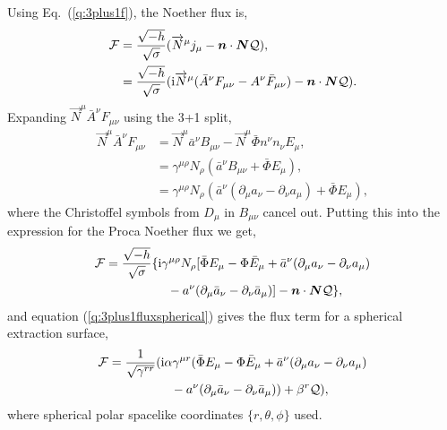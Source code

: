  Using Eq.~(\ref{q:3plus1f}), the Noether flux is,
\begin{align}
\mathcal{F} &= \frac{\sqrt{-h}}{\sqrt{\sigma}}(\overrightarrow{N}^\mu j_\mu - \boldsymbol{n} \cdot \boldsymbol{N}  \mathcal{Q}), \\
 &= \frac{\sqrt{-h}}{\sqrt{\sigma}} ( {\rm i}\overrightarrow{N}^\mu (\bar{A}^\nu F_{\mu\nu} - A^\nu \bar{F}_{\mu\nu}) - \boldsymbol{n} \cdot \boldsymbol{N}  \mathcal{Q}).
 \end{align}
 Expanding $\overrightarrow{N}^\mu \bar{A}^\nu F_{\mu\nu}$ using the 3+1 split,
 \begin{align}
 \overrightarrow{N}^\mu \bar{A}^\nu F_{\mu\nu} &= \overrightarrow{N}^\mu \bar{a}^\nu B_{\mu\nu} - \overrightarrow{N}^\mu\bar{\Phi} n^\nu n_\nu E_\mu, \\
                            &= \gamma^{\mu\rho }{N}_\rho( \bar{a}^\nu B_{\mu\nu} +  \bar{\Phi}E_\mu),\\
                            &= \gamma^{\mu\rho }{N}_\rho( \bar{a}^\nu (\partial_\mu a_\nu - \partial_\nu a_\mu) +  \bar{\Phi}E_\mu),
 \end{align}
 where the Christoffel symbols from $D_\mu$ in $B_{\mu\nu}$ cancel out. Putting this into the expression for the Proca Noether flux we get,
 \begin{align}
  \begin{split}\mathcal{F}&= \frac{\sqrt{-h}}{\sqrt{\sigma}} \{ {\rm i}\gamma^{\mu\rho}{N}_\rho [\bar{\Phi} E_\mu  -\Phi  \bar{E}_{\mu} +\bar{a}^\nu (\partial_\mu a_\nu - \partial_\nu a_\mu) \\ &\quad\quad\quad\quad\quad-  a^\nu (\partial_\mu \bar{a}_\nu - \partial_\nu \bar{a}_\mu)] - \boldsymbol{n} \cdot \boldsymbol{N}  \mathcal{Q}\},\end{split} 
 \end{align}
 and equation (\ref{q:3plus1fluxspherical}) gives the flux term for a spherical extraction surface,
 \begin{align} \begin{split}
\mathcal{F}&= \frac{1}{\sqrt{\gamma^{rr}}} ( {\rm i}\alpha\gamma^{\mu r} ( \bar{\Phi} E_\mu - {\Phi} \bar{E}_\mu + \bar{a}^\nu (\partial_\mu a_\nu - \partial_\nu a_\mu)  \\&\quad\quad\quad\quad\quad- {a}^\nu (\partial_\mu \bar{a}_\nu - \partial_\nu \bar{a}_\mu) ) + \beta^r  \mathcal{Q}),
 \end{split}\end{align}
 where spherical polar spacelike coordinates $\{r,\theta,\phi\}$ used.














